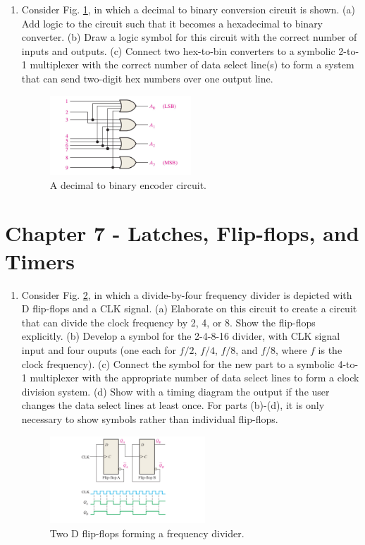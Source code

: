 \documentclass[10pt]{article}
\begin{document}
\begin{enumerate}
\item Consider Fig. \ref{fig:enc}, in which a decimal to binary conversion circuit is shown. (a) Add logic to the circuit such that it becomes a hexadecimal to binary converter. (b) Draw a logic symbol for this circuit with the correct number of inputs and outputs.  (c) Connect two hex-to-bin converters to a symbolic 2-to-1 multiplexer with the correct number of data select line(s) to form a system that can send two-digit hex numbers over one output line.
\begin{figure}[ht]
\centering
\includegraphics[width=0.5\textwidth]{figures/encoder.pdf}
\caption{\label{fig:enc} A decimal to binary encoder circuit.}
\end{figure} \vspace{2cm}
\end{enumerate}

\section{Chapter 7 - Latches, Flip-flops, and Timers}
\label{sec:latch}
\begin{enumerate}
\item Consider Fig. \ref{fig:twoDFF}, in which a divide-by-four frequency divider is depicted with D flip-flops and a CLK signal. (a) Elaborate on this circuit to create a circuit that can divide the clock frequency by 2, 4, or 8. Show the flip-flops explicitly.  (b) Develop a symbol for the 2-4-8-16 divider, with CLK signal input and four ouputs (one each for $f/2$, $f/4$, $f/8$, and $f/8$, where $f$ is the clock frequency). (c) Connect the symbol for the new part to a symbolic 4-to-1 multiplexer with the appropriate number of data select lines to form a clock division system.  (d) Show with a timing diagram the output if the user changes the data select lines at least once.  For parts (b)-(d), it is only necessary to show symbols rather than individual flip-flops.
\begin{figure}[ht]
\centering
\includegraphics[width=0.55\textwidth]{figures/twoDFF.pdf}
\caption{\label{fig:twoDFF} Two D flip-flops forming a frequency divider.}
\end{figure}
\end{enumerate}
\end{document}
